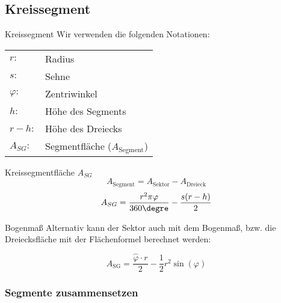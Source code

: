 
\newpage



\subsection{Kreissegment}


\begin{definition}{Kreissegment}{}
  Wir verwenden die folgenden Notationen:
  \begin{tabular}{ll}
    $r:$        & Radius \\
    $s:$        & Sehne  \\
    $\varphi: $ & Zentriwinkel \\
    $h:$        & Höhe des Segments\\
    $r-h:$      & Höhe des Dreiecks \\
    $A_{SG}:$    & Segmentfläche ($A_{\text{Segment}}$)
    \end{tabular}  
\end{definition}

\begin{gesetz}{Kreissegmentfläche $A_{SG}$}{}
  $$A_{\text{Segment}} = A_{\text{Sektor}} - A_{\text{Dreieck}}$$
  $$A_{SG} = \frac{r^2\pi\varphi}{360\degre} - \frac{s(r-h)}{2}$$
\end{gesetz}

\begin{bemerkung}{Bogenmaß}{}
  Alternativ kann der Sektor auch mit dem Bogenmaß, bzw. die
  Dreiecksfläche mit der Flächenformel berechnet werden:

  $$A_{\text{SG}} = \frac{\stackrel{\frown}{\varphi}\cdot{} r}2 - \frac12 r^2  \sin(\varphi)$$
\end{bemerkung}

\newpage


\subsubsection{Segmente zusammensetzen}

